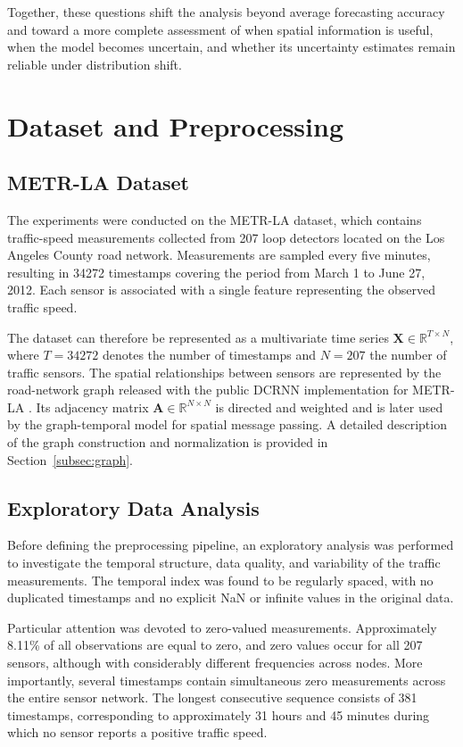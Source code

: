 Together, these questions shift the analysis beyond average forecasting
accuracy and toward a more complete assessment of when spatial information
is useful, when the model becomes uncertain, and whether its uncertainty
estimates remain reliable under distribution shift.

\section{Dataset and Preprocessing}
\label{sec:data}

\subsection{METR-LA Dataset}
\label{subsec:dataset}

The experiments were conducted on the METR-LA dataset, which contains
traffic-speed measurements collected from 207 loop detectors located on the
Los Angeles County road network. Measurements are sampled every five minutes,
resulting in 34272 timestamps covering the period from March 1 to June 27,
2012. Each sensor is associated with a single feature representing the
observed traffic speed.

The dataset can therefore be represented as a multivariate time series
$\mathbf{X} \in \mathbb{R}^{T \times N}$, where $T=34272$ denotes the
number of timestamps and $N=207$ the number of traffic sensors.
The spatial relationships between sensors are represented by the road-network
graph released with the public DCRNN implementation for METR-LA
\citep{li2018dcrnn}. Its adjacency matrix $\mathbf{A} \in \mathbb{R}^{N \times N}$ is
directed and weighted and is later used by the graph-temporal model for
spatial message passing. A detailed description of the graph construction and
normalization is provided in Section~\ref{subsec:graph}.


\subsection{Exploratory Data Analysis}
\label{subsec:eda}

Before defining the preprocessing pipeline, an exploratory analysis was
performed to investigate the temporal structure, data quality, and variability
of the traffic measurements. The temporal index was found to be regularly
spaced, with no duplicated timestamps and no explicit NaN or infinite values
in the original data.

Particular attention was devoted to zero-valued measurements. Approximately
8.11\% of all observations are equal to zero, and zero values occur for all
207 sensors, although with considerably different frequencies across nodes.
More importantly, several timestamps contain simultaneous zero measurements
across the entire sensor network. The longest consecutive sequence consists
of 381 timestamps, corresponding to approximately 31 hours and 45 minutes
during which no sensor reports a positive traffic speed.


